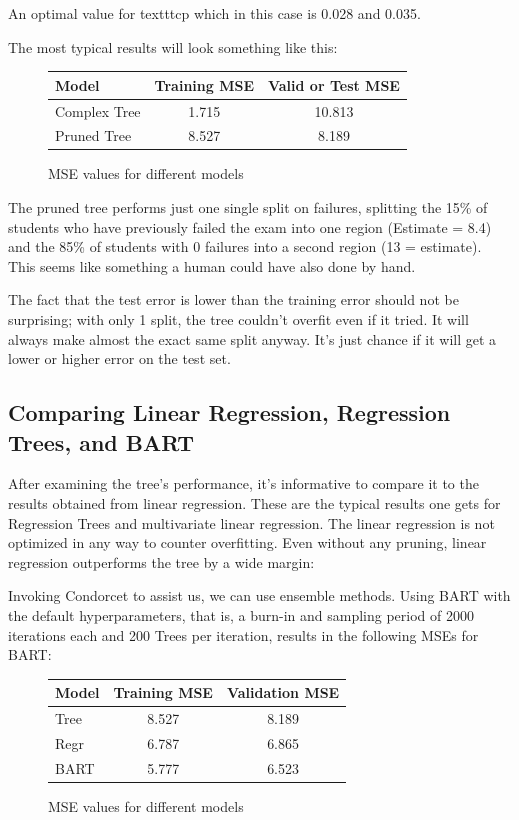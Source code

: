 \documentclass[12pt]{article}
\begin{document}
An optimal value for texttt{cp} which in this case is 0.028 and 0.035.


The most typical results will look something like this:

\begin{figure}
    \centering
    \begin{tabular}{| l | c | c |}
        \hline
        Model        & Training MSE & Valid or Test MSE \\
        \hline
        Complex Tree & 1.715        & 10.813            \\
        Pruned Tree  & 8.527        & 8.189             \\
        \hline
    \end{tabular}
    \caption{MSE values for different models}
\end{figure}

The pruned tree performs just one single split on failures, splitting the 15\% of students who have previously failed the exam into one region (Estimate = 8.4) and the 85\% of students with 0 failures into a second region (13 = estimate). This seems like something a human could have also done by hand.

The fact that the test error is lower than the training error should not be surprising; with only 1 split, the tree couldn't overfit even if it tried. It will always make almost the exact same split anyway. It's just chance if it will get a lower or higher error on the test set.


\subsection{Comparing Linear Regression, Regression Trees, and BART}

After examining the tree's performance, it's informative to compare it to the results obtained from linear regression. These are the typical results one gets for Regression Trees and multivariate linear regression. The linear regression is not optimized in any way to counter overfitting. Even without any pruning, linear regression outperforms the tree by a wide margin:

Invoking Condorcet to assist us, we can use ensemble methods. Using BART with the default hyperparameters, that is, a burn-in and sampling period of 2000 iterations each and 200 Trees per iteration, results in the following MSEs for BART:

\begin{figure}
    \centering
    \begin{tabular}{| l | c | c |}
        \hline
        Model & Training MSE & Validation MSE \\
        \hline
        Tree  & 8.527        & 8.189          \\
        Regr  & 6.787        & 6.865          \\
        BART  & 5.777        & 6.523          \\
        \hline
    \end{tabular}
    \caption{MSE values for different models}
\end{figure}
\end{document}

